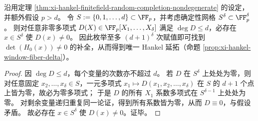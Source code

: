 \begin{proposition}\label{prop:xi-hankel-finitefield-deterministic-completion}
沿用定理 \ref{thm:xi-hankel-finitefield-random-completion-nondegenerate} 的设定，并额外假设 \(p>d\)。
令
\(
S:=\{0,1,\dots,d\}\subset \FF_p
\)，并考虑确定性网格 \(S^\delta\subset \FF_p^\delta\)。
则对任意非零多项式 \(D(X)\in \FF_p[X_1,\dots,X_\delta]\) 满足 \(\deg D\le d\)，必存在 \(x\in S^\delta\) 使 \(D(x)\neq 0\)。
因此枚举至多 \((d+1)^\delta\) 次赋值即可找到 \(\det(H_0(x))\neq 0\) 的补全，从而得到唯一 Hankel 延拓（命题 \ref{prop:xi-hankel-window-fiber-delta}）。
\end{proposition}
\begin{proof}
因 \(\deg D\le d\)，每个变量的次数亦不超过 \(d\)。
若 \(D\) 在 \(S^\delta\) 上处处为零，则对任意固定 \(x_2,\dots,x_\delta\in S\)，一元多项式
\(
x_1\mapsto D(x_1,x_2,\dots,x_\delta)
\)
在 \(S\) 的 \(d+1\) 个点上皆为零，故必为零多项式；
于是 \(D\) 的所有 \(X_1\) 系数多项式在 \(S^{\delta-1}\) 上处处为零。
对剩余变量递归重复同一论证，得到所有系数皆为零，从而 \(D\equiv 0\)，与假设矛盾。
故必存在 \(x\in S^\delta\) 使 \(D(x)\neq 0\)。证毕。
\end{proof}

\endinput
